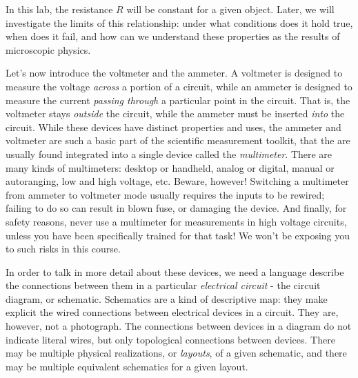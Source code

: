 \documentclass[12pt]{article}
\begin{document}
In this lab, the resistance $R$ will be constant for a given object.
Later, we will investigate the limits of this relationship: under what
conditions does it hold true, when does it fail, and how can we
understand these properties as the results of microscopic physics.

Let's now introduce the voltmeter and the ammeter.  A voltmeter is
designed to measure the voltage \textit{across} a portion of a
circuit, while an ammeter is designed to measure the current
\textit{passing through} a particular point in the circuit.  That is,
the voltmeter stays \textit{outside} the circuit, while the ammeter
must be inserted \textit{into} the circuit.  While these devices have
distinct properties and uses, the ammeter and voltmeter are such a
basic part of the scientific measurement toolkit, that the are usually
found integrated into a single device called the \textit{multimeter}.
There are many kinds of multimeters: desktop or handheld, analog or
digital, manual or autoranging, low and high voltage, etc.  Beware,
however!  Switching a multimeter from ammeter to voltmeter mode
usually requires the inputs to be rewired; failing to do so can result
in blown fuse, or damaging the device.  And finally, for safety
reasons, never use a multimeter for measurements in high voltage
circuits, unless you have been specifically trained for that task!  We
won't be exposing you to such risks in this course.

In order to talk in more detail about these devices, we need a
language describe the connections between them in a particular
\textit{electrical circuit} - the circuit diagram, or schematic.
Schematics are a kind of descriptive map: they make explicit the wired
connections between electrical devices in a circuit.  They are,
however, not a photograph.  The connections between devices in a
diagram do not indicate literal wires, but only topological
connections between devices.  There may be multiple physical
realizations, or \textit{layouts}, of a given schematic, and there may
be multiple equivalent schematics for a given layout.
\end{document}
